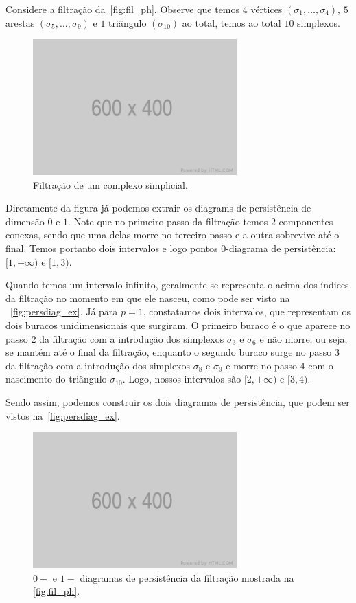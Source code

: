 Considere a filtração da~\autoref{fig:fil_ph}. Observe que temos $4$ vértices
$(\sigma_1,\dots,\sigma_4)$, $5$ arestas $(\sigma_5,\dots,\sigma_9)$
e $1$ triângulo $(\sigma_{10})$ ao total, temos ao total $10$ simplexos.
\begin{figure}[bht]
  \centering
  \includegraphics[width=0.7\textwidth]{images/placeholder.png}
  \caption{Filtração de um complexo simplicial.}
  \label{fig:fil_ph}
  \fautor
\end{figure}
Diretamente da figura já podemos extrair os diagrams de persistência de dimensão
$0$ e $1$. Note que no primeiro passo da filtração temos $2$ componentes conexas,
sendo que uma delas morre no terceiro passo e a outra sobrevive até o final.
Temos portanto dois intervalos e logo pontos $0$-diagrama de persistência:
$[1,+\infty)$ e $[1,3)$.

Quando temos um intervalo infinito, geralmente se representa o acima dos
índices da filtração no momento em que ele nasceu, como pode ser visto na
~\autoref{fig:persdiag_ex}. Já para $p=1$, constatamos dois intervalos,
que representam os dois buracos unidimensionais que surgiram. O primeiro buraco
é o que aparece no passo $2$ da filtração com a introdução dos simplexos
$\sigma_3$ e $\sigma_6$ e não morre, ou seja, se mantém até o final da filtração,
enquanto o segundo buraco surge no passo $3$ da filtração com a introdução
dos simplexos $\sigma_8$ e $\sigma_9$ e morre no passo $4$ com o nascimento
do triângulo $\sigma_{10}$. Logo, nossos intervalos são $[2, +\infty)$ e $[3,4)$.

Sendo assim, podemos construir os dois diagramas de persistência, que podem
ser vistos na~\autoref{fig:persdiag_ex}.
\begin{figure}[!htpb]
  \centering
  \includegraphics[width=0.7\textwidth]{images/placeholder.png}
  \caption{$0-$ e $1-$ diagramas de persistência da filtração mostrada na
  \autoref{fig:fil_ph}.}
  \label{fig:persdiag_ex}
  \fautor
\end{figure}

